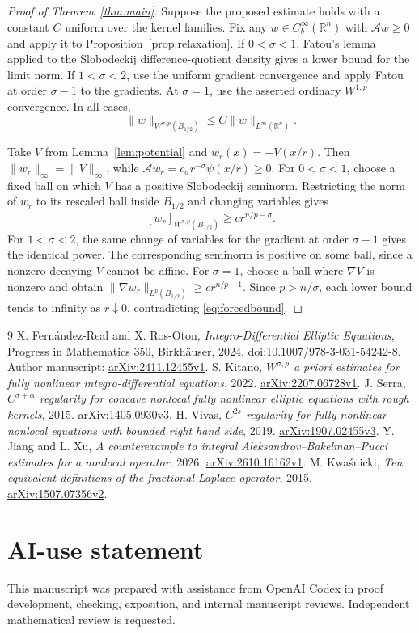 \documentclass[11pt]{article}
\newcommand{\R}{\mathbb R}
\newcommand{\A}{\mathcal A}
\newcommand{\norm}[1]{\lVert#1\rVert}
\newcommand{\Cb}{C_b^\infty(\R^n)}
\theoremstyle{remark}
\numberwithin{equation}{section}
\begin{document}
\begin{proof}[Proof of Theorem~\ref{thm:main}]
Suppose the proposed estimate holds with a constant $C$ uniform over the
kernel families. Fix any $w\in\Cb$ with $\A w\ge0$ and apply it to
Proposition~\ref{prop:relaxation}. If $0<\sigma<1$, Fatou's lemma applied
to the Slobodeckij difference-quotient density gives a lower bound for
the limit norm. If $1<\sigma<2$, use the uniform gradient convergence
and apply Fatou at order $\sigma-1$ to the gradients. At $\sigma=1$,
use the asserted ordinary $W^{1,p}$ convergence. In all cases,
\begin{equation}\label{eq:forcedbound}
 \norm w_{W^{\sigma,p}(B_{1/2})}\le C\norm w_{L^\infty(\R^n)}.
\end{equation}

Take $V$ from Lemma~\ref{lem:potential} and $w_r(x)=-V(x/r)$.
Then $\norm{w_r}_\infty=\norm V_\infty$, while
$\A w_r=c_\sigma r^{-\sigma}\psi(x/r)\ge0$.
For $0<\sigma<1$, choose a fixed ball on which $V$ has a positive
Slobodeckij seminorm. Restricting the norm of $w_r$ to its rescaled ball
inside $B_{1/2}$ and changing variables gives
\[
 [w_r]_{W^{\sigma,p}(B_{1/2})}\ge c r^{n/p-\sigma}.
\]
For $1<\sigma<2$, the same change of variables for the gradient at order
$\sigma-1$ gives the identical power. The corresponding seminorm is
positive on some ball, since a nonzero decaying $V$ cannot be affine.
For $\sigma=1$, choose a ball where $\nabla V$ is nonzero and obtain
$\norm{\nabla w_r}_{L^p(B_{1/2})}\ge c r^{n/p-1}$.
Since $p>n/\sigma$, each lower bound tends to infinity as $r\downarrow0$,
contradicting \eqref{eq:forcedbound}.
\end{proof}


\begin{thebibliography}{9}
X. Fern\'andez-Real and X. Ros-Oton,
\emph{Integro-Differential Elliptic Equations},
Progress in Mathematics 350, Birkh\"auser, 2024.
\href{https://doi.org/10.1007/978-3-031-54242-8}{doi:10.1007/978-3-031-54242-8}.
Author manuscript: \href{https://arxiv.org/abs/2411.12455v1}{arXiv:2411.12455v1}.
S. Kitano, \emph{$W^{\sigma,p}$ a priori estimates for fully nonlinear
integro-differential equations}, 2022.
\href{https://arxiv.org/abs/2207.06728v1}{arXiv:2207.06728v1}.
J. Serra, \emph{$C^{\sigma+\alpha}$ regularity for concave nonlocal fully
nonlinear elliptic equations with rough kernels}, 2015.
\href{https://arxiv.org/abs/1405.0930v3}{arXiv:1405.0930v3}.
H. Vivas, \emph{$C^{2s}$ regularity for fully nonlinear nonlocal equations
with bounded right hand side}, 2019.
\href{https://arxiv.org/abs/1907.02455v3}{arXiv:1907.02455v3}.
Y. Jiang and L. Xu, \emph{A counterexample to integral
Aleksandrov--Bakelman--Pucci estimates for a nonlocal operator}, 2026.
\href{https://arxiv.org/abs/2610.16162v1}{arXiv:2610.16162v1}.
M. Kwa\'snicki, \emph{Ten equivalent definitions of the fractional
Laplace operator}, 2015.
\href{https://arxiv.org/abs/1507.07356v2}{arXiv:1507.07356v2}.
\end{thebibliography}

\section*{AI-use statement}
This manuscript was prepared with assistance from OpenAI Codex in proof
development, checking, exposition, and internal manuscript reviews.
Independent mathematical review is requested.
\end{document}
